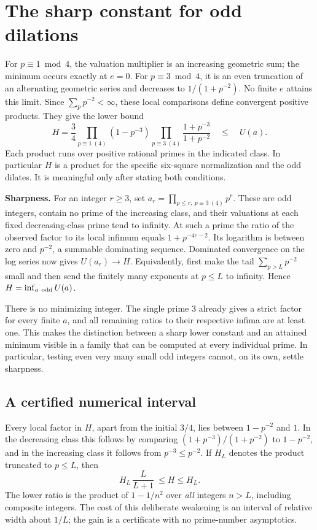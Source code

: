 \documentclass[12pt,letterpaper]{article}
\begin{document}
\clearpage\section{The sharp constant for odd dilations}
For \(p\equiv1\bmod4\), the valuation multiplier is an increasing geometric sum; the minimum occurs exactly at \(e=0\). For \(p\equiv3\bmod4\), it is an even truncation of an alternating geometric series and decreases to \(1/(1+p^{-2})\). No finite \(e\) attains this limit. Since \(\sum_p p^{-2}<\infty\), these local comparisons define convergent positive products. They give the lower bound
\[
 H=\frac34
    \prod_{p\equiv1\ (4)}(1-p^{-3})
    \prod_{p\equiv3\ (4)}\frac{1+p^{-3}}{1+p^{-2}}
   \quad\le\quad U(a).
\]
Each product runs over positive rational primes in the indicated class. In particular \(H\) is a product for the specific six-square normalization and the odd dilates. It is meaningful only after stating both conditions.

\textbf{Sharpness.} For an integer \(r\ge3\), set \(a_r=\prod_{p\le r,\ p\equiv3\ (4)}p^r\). These are odd integers, contain no prime of the increasing class, and their valuations at each fixed decreasing-class prime tend to infinity. At such a prime the ratio of the observed factor to its local infimum equals \(1+p^{-4e-2}\). Its logarithm is between zero and \(p^{-2}\), a summable dominating sequence. Dominated convergence on the log series now gives \(U(a_r)\to H\). Equivalently, first make the tail \(\sum_{p>L}p^{-2}\) small and then send the finitely many exponents at \(p\le L\) to infinity. Hence \(H=\inf_{a\ {\rm odd}}U(a)\).

There is no minimizing integer. The single prime \(3\) already gives a strict factor for every finite \(a\), and all remaining ratios to their respective infima are at least one. This makes the distinction between a sharp lower constant and an attained minimum visible in a family that can be computed at every individual prime. In particular, testing even very many small odd integers cannot, on its own, settle sharpness.

\clearpage\subsection{A certified numerical interval}
Every local factor in \(H\), apart from the initial \(3/4\), lies between \(1-p^{-2}\) and \(1\). In the decreasing class this follows by comparing \((1+p^{-3})/(1+p^{-2})\) to \(1-p^{-2}\), and in the increasing class it follows from \(p^{-3}\le p^{-2}\). If \(H_L\) denotes the product truncated to \(p\le L\), then
\[
             H_L\,\frac{L}{L+1}\ \le H\le H_L .
\]
The lower ratio is the product of \(1-1/n^2\) over \emph{all} integers \(n>L\), including composite integers. The cost of this deliberate weakening is an interval of relative width about \(1/L\); the gain is a certificate with no prime-number asymptotics.
\end{document}
